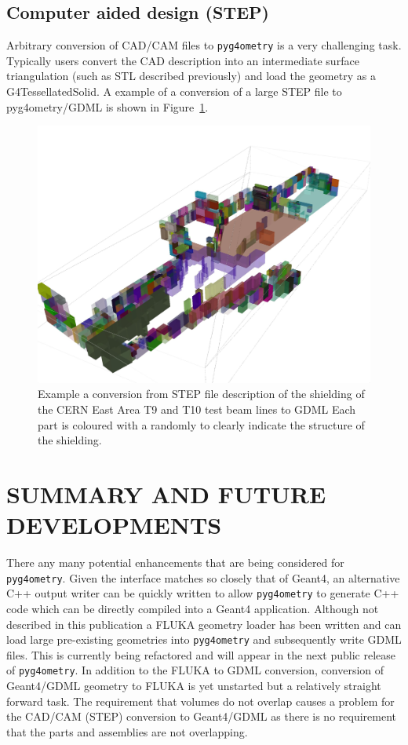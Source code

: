 \documentclass[a4paper,
               keeplastbox,   %
               ]{jacow}
\begin{document}
\subsection{Computer aided design (STEP)}
Arbitrary conversion of CAD/CAM files to \verb|pyg4ometry| is a very challenging task. Typically users convert the CAD description into
an intermediate surface triangulation (such as STL described previously) and load the geometry as a G4TessellatedSolid.
A example of a conversion of a large STEP file to pyg4ometry/GDML is shown in Figure~\ref{fig:ea910}.
\begin{figure}[!htb]
   \centering
   \includegraphics*[width=.9\columnwidth]{./examples/ea9-10.jpg}
   \caption{Example a conversion from STEP file description of the shielding of the CERN East Area T9 and T10 test beam lines to GDML Each part is 
   coloured with a randomly to clearly indicate the structure of the shielding.}
   \label{fig:ea910}
\end{figure}

\section{SUMMARY AND FUTURE DEVELOPMENTS}
There any many potential enhancements that are being considered for \verb|pyg4ometry|. Given the interface matches so closely that of Geant4, 
an alternative C++ output writer can be quickly written to allow \verb|pyg4ometry| to generate C++ code which can be directly compiled into a 
Geant4 application.
Although not described in this publication a FLUKA geometry loader has been written and can load large pre-existing geometries into 
\verb|pyg4ometry| and subsequently write GDML files. This is currently being refactored and will appear in the next public release of \verb|pyg4ometry|.
In addition to the FLUKA to GDML conversion, conversion of Geant4/GDML geometry to FLUKA is yet unstarted but a relatively straight forward
task. The requirement that volumes do not overlap causes a problem for the CAD/CAM (STEP) conversion to Geant4/GDML as there is no requirement 
that the parts and assemblies are not overlapping. 
\end{document}
